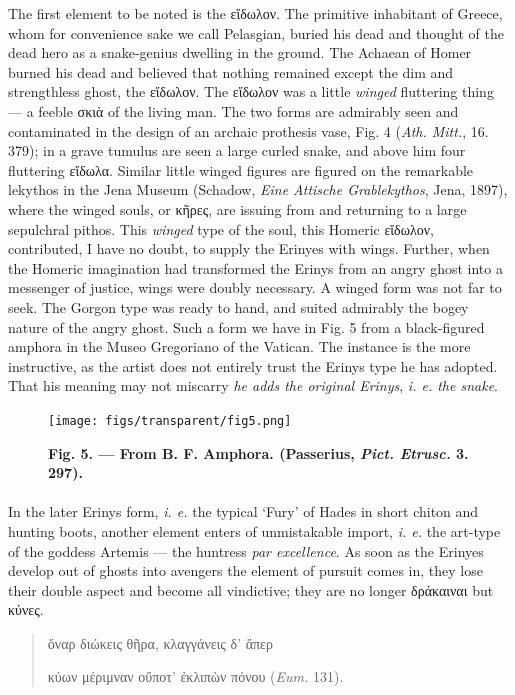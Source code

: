 \documentclass[a4paper, 11pt, oneside, polutonikogreek, english]{article}
\begin{document}
The first element to be noted is the εἴδωλον. The primitive inhabitant of Greece, whom for convenience sake we call Pelasgian, buried his dead and thought of the dead hero as a snake-genius dwelling in the ground. The Achaean of Homer burned his dead and believed that nothing remained except the dim and strengthless ghost, the εἴδωλον. The εἴδωλον was a little \emph{winged} fluttering thing --- a feeble σκιὰ of the living man. The two forms are admirably seen and contaminated in the design of an archaic prothesis vase, Fig. 4 (\emph{Ath. Mitt.}, 16. 379); in a grave tumulus are seen a large curled snake, and above him four fluttering εἴδωλα. Similar little winged figures are figured on the remarkable lekythos in the Jena Museum (Schadow, \emph{Eine Attische Grablekythos}, Jena, 1897), where the winged souls, or κῆρες, are issuing from and returning to a large sepulchral pithos. This \emph{winged} type of the soul, this Homeric εἴδωλον, contributed, I have no doubt, to supply the Erinyes with wings. Further, when the Homeric imagination had transformed the Erinys from an angry ghost into a messenger of justice, wings were doubly necessary. A winged form was not far to seek. The Gorgon type was ready to hand, and suited admirably the bogey nature of the angry ghost. Such a form we have in Fig. 5 from a black-figured amphora in the Museo Gregoriano of the Vatican. The instance is the more instructive, as the artist does not entirely trust the Erinys type he has adopted. That his meaning may not miscarry \emph{he adds the original Erinys}, \emph{i. e. the snake}.
\begin{figure}[H]
\centering
\texttt{[image: figs/transparent/fig5.png]}
\caption{\bfseries Fig. 5. --- From B. F. Amphora. (Passerius, \emph{Pict. Etrusc.} 3. 297).}
\end{figure}
\paragraph{}
In the later Erinys form, \emph{i. e.} the typical `Fury' of Hades in short chiton and hunting boots, another element enters of unmistakable import, \emph{i. e.} the art-type of the goddess Artemis --- the huntress \emph{par excellence}. As soon as the Erinyes develop out of ghosts into avengers the element of pursuit comes in, they lose their double aspect and become all vindictive; they are no longer δράκαιναι but κύνες.
\begin{quotation}
\large
ὄναρ διώκεις θῆρα, κλαγγάνεις δ' ἅπερ

κύων μέριμναν οὔποτ' ἐκλιπὼν πόνου (\emph{Eum.} 131).
\end{quotation}
\end{document}
